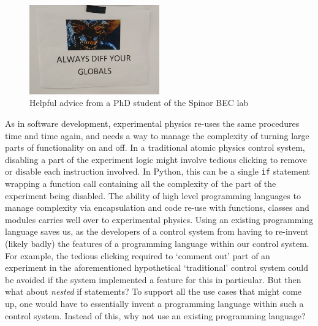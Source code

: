 \begin{figure}
\begin{center}
\includegraphics[width=0.5\textwidth]{figures/software/globals_diff.png}
\caption{Helpful advice from a PhD student of the Spinor BEC lab}\label{fig:globals_diff}
\end{center}
\end{figure}

As in software development, experimental physics re-uses the same procedures time and time again, and needs a way to manage the complexity of turning large parts of functionality on and off. In a traditional atomic physics control system, disabling a part of the experiment logic might involve tedious clicking to remove or disable each instruction involved. In Python, this can be a single \texttt{if} statement wrapping a function call containing all the complexity of the part of the experiment being disabled. The ability of high level programming languages to manage complexity via encapsulation and code re-use with functions, classes and modules carries well over to experimental physics. Using an existing programming language saves us, as the developers of a control system from having to re-invent (likely badly) the features of a programming language within our control system. For example, the tedious clicking required to `comment out' part of an experiment in the aforementioned hypothetical `traditional' control system could be avoided if the system implemented a feature for this in particular. But then what about \emph{nested} if statements? To support all the use cases that might come up, one would have to essentially invent a programming language within such a control system. Instead of this, why not use an existing programming language?

